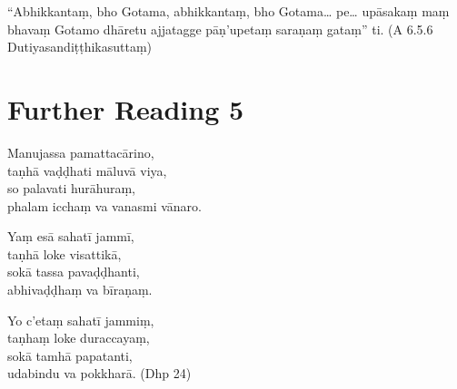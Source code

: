 “Abhikkantaṃ, bho Gotama, abhikkantaṃ, bho Gotama… pe… upāsakaṃ maṃ bhavaṃ Gotamo dhāretu ajjatagge pāṇ’upetaṃ saraṇaṃ gataṃ” ti. (A 6.5.6 Dutiyasandiṭṭhikasuttaṃ)

\section*{Further Reading 5}

Manujassa pamattacārino,\\
taṇhā vaḍḍhati māluvā viya,\\
so palavati hurāhuraṃ,\\
phalam icchaṃ va vanasmi vānaro.

Yaṃ esā sahatī jammī,\\
taṇhā loke visattikā,\\
sokā tassa pavaḍḍhanti,\\
abhivaḍḍhaṃ va bīraṇaṃ.

Yo c’etaṃ sahatī jammiṃ,\\
taṇhaṃ loke duraccayaṃ,\\
sokā tamhā papatanti,\\
udabindu va pokkharā. (Dhp 24)